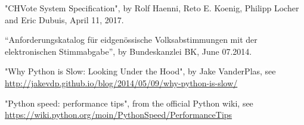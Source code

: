 \begin{thebibliography}{999}
	"CHVote System Specification", by Rolf Haenni, Reto E. Koenig, Philipp Locher and Eric Dubuis, April 11, 2017.

	"`Anforderungskatalog für eidgenössische Volksabstimmungen mit der elektronischen Stimmabgabe"', by Bundeskanzlei BK, June 07.2014.

	"Why Python is Slow: Looking Under the Hood", by Jake VanderPlas, see \url{http://jakevdp.github.io/blog/2014/05/09/why-python-is-slow/}

	"Python speed: performance tips", from the official Python wiki, see \url{https://wiki.python.org/moin/PythonSpeed/PerformanceTips}
\end{thebibliography}
